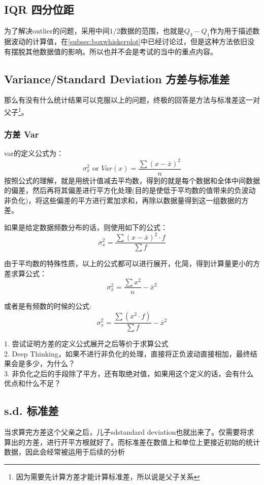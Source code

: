 \subsection*{IQR 四分位距}
为了解决outlier的问题，采用中间$1/2$数据的范围，也就是$Q_3-Q_1$作为用于描述数据波动的计算值，在\ref{subsec:boxwhiskerplot}中已经讨论过，但是这种方法依旧没有摆脱其他数据值的影响。所以也并不会是考试的当中的重点内容。

\subsection*{Variance/Standard Deviation 方差与标准差}
那么有没有什么统计结果可以克服以上的问题，终极的回答是方法与标准差这一对父子\footnote{因为需要先计算方差才能计算标准差，所以说是父子关系}。

\subsubsection*{方差 Var}
\gls{var}的定义公式为：
\[
    \sigma^2_x \text{ or } Var(x)= \frac{\sum(x-\bar{x})^2}{n}
\]
按照公式的理解，就是用统计值减去平均数，得到的就是每个数据和全体中间数据的偏差，然后再将其偏差进行平方化处理(目的是使低于平均数的值带来的负波动非负化)，将这些偏差的平方进行累加求和，再除以数据量得到这一组数据的方差。

如果是给定数据频数分布的话，则使用如下的公式：
\[
    \sigma^2_x= \frac{\sum (x-\bar{x})^2\cdot f}{\sum f} 
\]

由于平均数的特殊性质，以上的公式都可以进行展开，化简，得到计算量更小的方差求算公式：
\[
     \sigma^2_x = \frac{\sum x^2}{n} -\bar{x}^2
\]

或者是有频数的时候的公式:
\[
     \sigma^2_x = \frac{\sum (x^2 \cdot f)}{\sum f} -\bar{x}^2
\]

\begin{TaskBox}
1. 尝试证明方差的定义公式展开之后等价于求算公式\\

2. Deep Thinking，如果不进行非负化的处理，直接将正负波动直接相加，最终结果会是多少，为什么？\\

3. 非负化之后的手段除了平方，还有取绝对值，如果用这个定义的话，会有什么优点和什么不足？
\end{TaskBox}


\subsection*{s.d. 标准差}
当求算完方差这个父亲之后，儿子\gls{sd}standard deviation也就出来了。仅需要将求算出的方差，进行开平方根就好了。而标准差在数值上和单位上更接近初始的统计数据，因此会经常被运用于后续的分析

